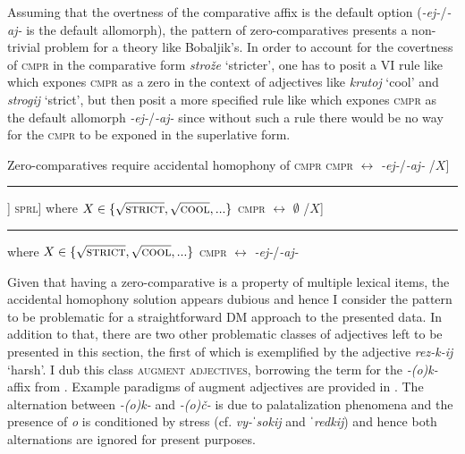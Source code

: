 \documentclass[output=paper,colorlinks,citecolor=brown]{langscibook}
\begin{document}
Assuming that the overtness of the comparative affix is the default option (\textit{-ej-}/\textit{-aj-} is the default allomorph), the pattern of zero-comparatives presents a non-trivial problem for a theory like Bobaljik's. In order to account for the covertness of \textsc{cmpr} in the comparative form \textit{strože} `stricter', one has to posit a VI rule like  which expones \textsc{cmpr} as a zero in the context of adjectives like \textit{krutoj} `cool' and \textit{strogij} `strict', but then posit a more specified rule like  which expones \textsc{cmpr} as the default allomorph \textit{-ej-}/\textit{-aj-} since without such a rule there would be no way for the \textsc{cmpr} to be exponed in the superlative form. 

\ea Zero-comparatives require accidental homophony of \textsc{cmpr}
    \ea \textsc{cmpr} $\leftrightarrow$ \textit{-ej-}/\textit{-aj-} /$X$]\rule{4mm}{.4pt}] \textsc{sprl}] where $X \in \{\sqrt{\mbox{\textsc{strict}}}, \sqrt{\mbox{\textsc{cool}}}, ...\}$\label{kas:ex:nonzero:vi}
    \ex \textsc{cmpr} $\leftrightarrow$ $\emptyset$ /$X$]\rule{4mm}{.4pt} where $X\in\{\sqrt{\mbox{\textsc{strict}}}, \sqrt{\mbox{\textsc{cool}}}, ...\}$\label{kas:ex:zero:vi}
	\ex  \textsc{cmpr} $\leftrightarrow$ \textit{-ej-}/\textit{-aj-}
    \z
\z

\noindent Given that having a zero-comparative is a property of multiple lexical items, the accidental homophony solution  appears dubious and hence I consider the pattern to be problematic for a straightforward DM approach to the presented data. In addition to that, there are two other problematic classes of adjectives left to be presented in this section, the first of which is exemplified by the adjective \textit{rez-k-ij} `harsh'. I dub this class \textsc{augment adjectives}, borrowing the term for the \textit{-(o)k-} affix from \citet{VandenWyngaerd:2020}. Example paradigms of augment adjectives are provided in . The alternation between \textit{-(o)k-} and \textit{-(o)č-} is due to palatalization phenomena and the presence of \textit{o} is conditioned by stress (cf. \textit{vy-ˈsokij} and \textit{ˈredkij}) and hence both alternations are ignored for present purposes.
\end{document}
